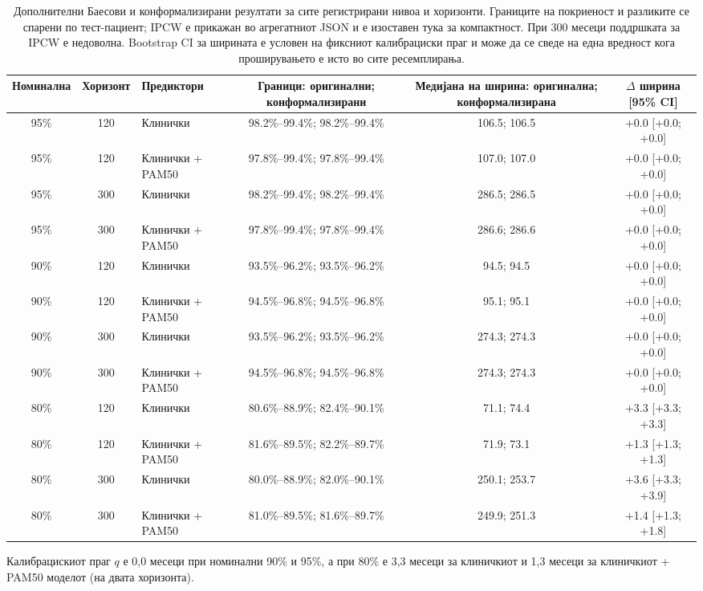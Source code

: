 \documentclass[12pt]{article}
\begin{document}
\begin{table}[htbp]
\centering
\small
\setlength{\tabcolsep}{3pt}
\caption{Дополнителни Баесови и конформализирани резултати за сите регистрирани нивоа и хоризонти. Границите на покриеност и разликите се спарени по тест-пациент; IPCW е прикажан во агрегатниот JSON и е изоставен тука за компактност. При 300 месеци поддршката за IPCW е недоволна. Bootstrap CI за ширината е условен на фиксниот калибрациски праг и може да се сведе на една вредност кога проширувањето е исто во сите ресемплирања.}
\label{tab:bayesian-conformal-supplement}
\begin{tabular}{@{}cc lcc c@{}}
\toprule
Номинална & Хоризонт & Предиктори & Граници: оригинални; конформализирани & Медијана на ширина: оригинална; конформализирана & $\Delta$ ширина [95\% CI] \\
\midrule
95\% & 120 & Клинички & 98.2\%--99.4\%; 98.2\%--99.4\% & 106.5; 106.5 & +0.0 [+0.0; +0.0] \\
95\% & 120 & Клинички + PAM50 & 97.8\%--99.4\%; 97.8\%--99.4\% & 107.0; 107.0 & +0.0 [+0.0; +0.0] \\
95\% & 300 & Клинички & 98.2\%--99.4\%; 98.2\%--99.4\% & 286.5; 286.5 & +0.0 [+0.0; +0.0] \\
95\% & 300 & Клинички + PAM50 & 97.8\%--99.4\%; 97.8\%--99.4\% & 286.6; 286.6 & +0.0 [+0.0; +0.0] \\
90\% & 120 & Клинички & 93.5\%--96.2\%; 93.5\%--96.2\% & 94.5; 94.5 & +0.0 [+0.0; +0.0] \\
90\% & 120 & Клинички + PAM50 & 94.5\%--96.8\%; 94.5\%--96.8\% & 95.1; 95.1 & +0.0 [+0.0; +0.0] \\
90\% & 300 & Клинички & 93.5\%--96.2\%; 93.5\%--96.2\% & 274.3; 274.3 & +0.0 [+0.0; +0.0] \\
90\% & 300 & Клинички + PAM50 & 94.5\%--96.8\%; 94.5\%--96.8\% & 274.3; 274.3 & +0.0 [+0.0; +0.0] \\
80\% & 120 & Клинички & 80.6\%--88.9\%; 82.4\%--90.1\% & 71.1; 74.4 & +3.3 [+3.3; +3.3] \\
80\% & 120 & Клинички + PAM50 & 81.6\%--89.5\%; 82.2\%--89.7\% & 71.9; 73.1 & +1.3 [+1.3; +1.3] \\
80\% & 300 & Клинички & 80.0\%--88.9\%; 82.0\%--90.1\% & 250.1; 253.7 & +3.6 [+3.3; +3.9] \\
80\% & 300 & Клинички + PAM50 & 81.0\%--89.5\%; 81.6\%--89.7\% & 249.9; 251.3 & +1.4 [+1.3; +1.8] \\
\bottomrule
\end{tabular}
\begin{minipage}{0.98\linewidth}\footnotesize
Калибрацискиот праг $q$ е 0,0 месеци при номинални 90\% и 95\%, а при 80\% е
3,3 месеци за клиничкиот и 1,3 месеци за клиничкиот + PAM50 моделот (на двата хоризонта).
\end{minipage}
\end{table}
\end{document}
